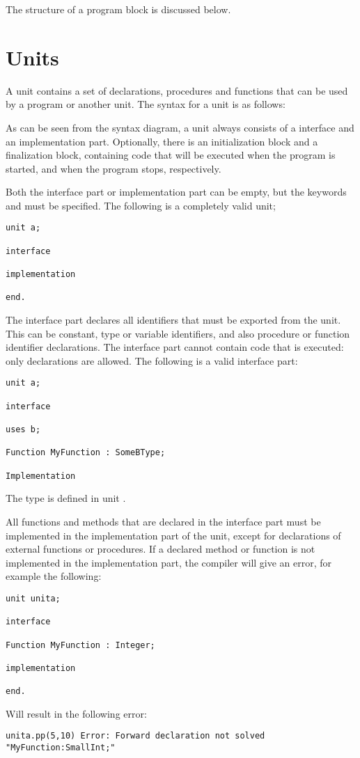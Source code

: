 The structure of a program block is discussed below.

\section{Units}
A unit contains a set of declarations, procedures and functions that can be
used by a program or another unit.
The syntax for a unit is as follows:

As can be seen from the syntax diagram, a unit always consists of a
interface and an implementation part. Optionally, there is an initialization
block and a finalization block, containing code that will be executed when
the program is started, and when the program stops, respectively.

Both the interface part or implementation part can be empty, but the
keywords  and  must be specified.
The following is a completely valid unit;
\begin{verbatim}
unit a;

interface

implementation

end.
\end{verbatim}

The interface part declares all identifiers that must be exported from the
unit. This can be constant, type or variable identifiers, and also procedure
or function identifier declarations.  The interface part cannot contain code
that is executed: only declarations are allowed. The following is a valid
interface part:
\begin{verbatim}
unit a;

interface

uses b;

Function MyFunction : SomeBType;

Implementation
\end{verbatim}
The type  is defined in unit .

All functions and methods that are declared in the interface part must
be implemented in the implementation part of the unit, except for
declarations of external functions or procedures. If a declared method 
or function is not implemented in the implementation part, the compiler
will give an error, for example the following:
\begin{verbatim}
unit unita;

interface

Function MyFunction : Integer;

implementation

end.
\end{verbatim}
Will result in the following error:
\begin{verbatim}
unita.pp(5,10) Error: Forward declaration not solved "MyFunction:SmallInt;"
\end{verbatim}

